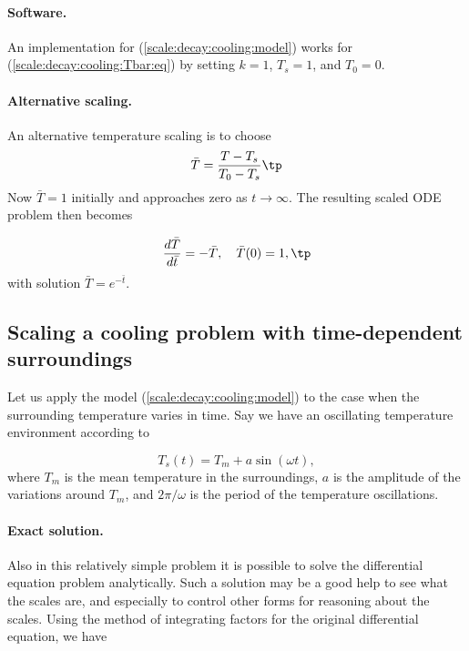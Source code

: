 \documentclass[graybox,envcountchap,sectrefs,final]{svmonodo}
\begin{document}
\paragraph{Software.}
An implementation for (\ref{scale:decay:cooling:model}) works for
(\ref{scale:decay:cooling:Tbar:eq}) by setting $k=1$, $T_s=1$, and $T_0=0$.

\paragraph{Alternative scaling.}
An alternative temperature scaling is to choose
\begin{equation}
\bar T = \frac{T-T_s}{T_0-T_s}
\label{scale:decay:cooling:Tbar2}
\tp
\end{equation}
Now $\bar T=1$ initially and approaches zero as $t\rightarrow\infty$.
The resulting scaled ODE problem then becomes

\begin{equation}
\frac{d\bar T}{d\bar t} = - \bar T,\quad \bar T(0)=1,
\label{scale:decay:cooling:Tbar:eq2}
\tp
\end{equation}
with solution $\bar T = e^{-\bar t}$.

\subsection{Scaling a cooling problem with time-dependent surroundings}
\label{scale:decay:cooling:osc}

Let us apply the model (\ref{scale:decay:cooling:model}) to the case when
the surrounding temperature varies in time. Say we have
an oscillating temperature environment according to

\begin{equation}
T_s(t) = T_m + a\sin(\omega t),
\label{scale:decay:cooling:Tst}
\end{equation}
where $T_m$ is the mean temperature in the surroundings, $a$ is
the amplitude of the variations around $T_m$, and $2\pi/\omega$ is
the period of the temperature oscillations.

\paragraph{Exact solution.}
Also in this relatively simple problem
it is possible to solve the differential equation problem analytically.
Such a solution may be a good help to see what the scales are, and
especially to control other forms for reasoning about the scales.
Using the method of integrating factors for the
original differential equation, we have
\end{document}
